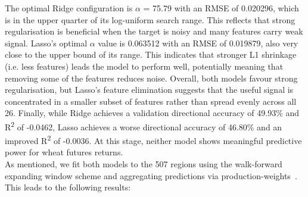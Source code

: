 \documentclass[pdflatex,sn-mathphys-num, oneside, 11pt]{sn-jnl}%
\theoremstyle{thmstyleone}%
\theoremstyle{thmstyletwo}%
\theoremstyle{thmstylethree}%
\begin{document}
The optimal Ridge configuration is $\alpha$ = 75.79 with an RMSE of 0.020296, which is in the upper quarter of its log-uniform search range. This reflects that strong regularisation is beneficial when the target is noisy and many features carry weak signal. Lasso's optimal $\alpha$ value is 0.063512 with an RMSE of 0.019879, also very close to the upper bound of its range. This indicates that stronger L1 shrinkage (i.e. less features) leads the model to perform well, potentially meaning that removing some of the features reduces noise. Overall, both models favour strong regularisation, but Lasso's feature elimination suggests that the useful signal is concentrated in a smaller subset of features rather than spread evenly across all 26. Finally, while Ridge achieves a validation directional accuracy of 49.93\% and R\textsuperscript{2} of -0.0462, Lasso achieves a worse directional accuracy of 46.80\% and an improved R\textsuperscript{2} of -0.0036. At this stage, neither model shows meaningful predictive power for wheat futures returns.\\

As mentioned, we fit both models to the 507 regions using the walk-forward expanding window scheme and aggregating predictions via production-weights~\cite{bib16}. This leads to the following results:
\end{document}
